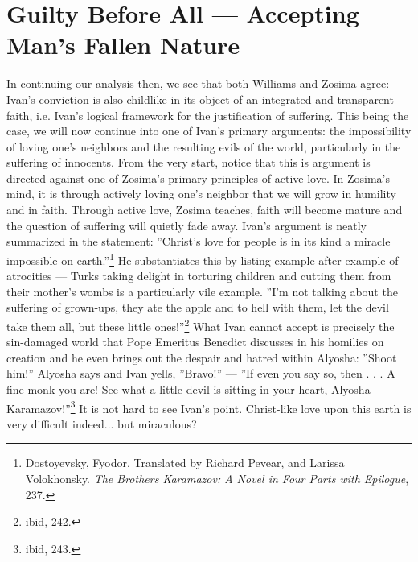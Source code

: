 \section{Guilty Before All --- Accepting Man's Fallen Nature}
In continuing our analysis then, we see that both Williams and Zosima agree: Ivan's conviction is also childlike in its object of an integrated and transparent faith, i.e. Ivan's logical framework for the justification of suffering. This being the case, we will now continue into one of Ivan's primary arguments: the impossibility of loving one's neighbors and the resulting evils of the world, particularly in the suffering of innocents. From the very start, notice that this is argument is directed against one of Zosima's primary principles of active love. In Zosima's mind, it is through actively loving one's neighbor that we will grow in humility and in faith. Through active love, Zosima teaches, faith will become mature and the question of suffering will quietly fade away. Ivan's argument is neatly summarized in the statement: ''Christ's love for people is in its kind a miracle impossible on earth.''\footnote{Dostoyevsky, Fyodor. Translated by Richard Pevear, and Larissa Volokhonsky. \emph{The Brothers Karamazov: A Novel in Four Parts with Epilogue}, 237.} He substantiates this by listing example after example of atrocities --- Turks taking delight in torturing children and cutting them from their mother's wombs is a particularly vile example. ''I'm not talking about the suffering of grown-ups, they ate the apple and to hell with them, let the devil take them all, but these little ones!''\footnote{ibid, 242.} What Ivan cannot accept is precisely the sin-damaged world that Pope Emeritus Benedict discusses in his homilies on creation and he even brings out the despair and hatred within Alyosha: ''Shoot him!'' Alyosha says and Ivan yells, ''Bravo!'' --- ''If even you say so, then . . . A fine monk you are! See what a little devil is sitting in your heart, Alyosha Karamazov!''\footnote{ibid, 243.} It is not hard to see Ivan's point. Christ-like love upon this earth is very difficult indeed... but miraculous?

